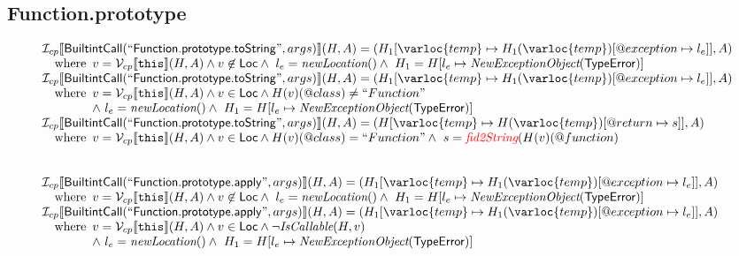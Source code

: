 \subsection{Function.prototype}
\[
\begin{array}{l}

\I _{cp}\lbr \SF{BuiltintCall}(``\SF{Function.prototype.toString}",args)\rbr(H,A)
 = (H_1[\varloc{temp}\mapsto H_1(\varloc{temp})[\varprop{exception}\mapsto l_e]], A) \\
\quad\wherec{
  v = \V _{cp}\lbr \TT{this}\rbr (H,A) \land v \not\in \SF{Loc}
  \land\ l_e = \hf{newLocation}() \land\ H_1=H[l_e\mapsto\hf{NewExceptionObject}(\SF{TypeError})] 
  }\\
  
\I _{cp}\lbr \SF{BuiltintCall}(``\SF{Function.prototype.toString}",args)\rbr(H,A)
 = (H_1[\varloc{temp}\mapsto H_1(\varloc{temp})[\varprop{exception}\mapsto l_e]], A) \\
\quad\wherec{
  v = \V _{cp}\lbr \TT{this}\rbr (H,A) \land v \in \SF{Loc} \land H(v)(@class) \neq ``Function"\\
  \land\ l_e = \hf{newLocation}() \land\ H_1=H[l_e\mapsto\hf{NewExceptionObject}(\SF{TypeError})] 
  }\\
  
\I _{cp}\lbr \SF{BuiltintCall}(``\SF{Function.prototype.toString}",args)\rbr(H,A)
 = (H[\varloc{temp}\mapsto H(\varloc{temp})[\varprop{return}\mapsto s]], A) \\
\quad\wherec{ 
  v = \V _{cp}\lbr \TT{this}\rbr (H,A) \land v \in \SF{Loc} \land H(v)(@class) = ``Function"
  \land\ s = \hf{\inred fid2String}(H(v)(\varprop{function})
  }\\
\\\\


\I _{cp}\lbr \SF{BuiltintCall}(``\SF{Function.prototype.apply}",args)\rbr(H,A)
 = (H_1[\varloc{temp}\mapsto H_1(\varloc{temp})[\varprop{exception}\mapsto l_e]], A) \\
\quad\wherec{
  v = \V _{cp}\lbr \TT{this}\rbr (H,A) \land v \not\in \SF{Loc}
  \land\ l_e = \hf{newLocation}() \land\ H_1=H[l_e\mapsto\hf{NewExceptionObject}(\SF{TypeError})] 
  }\\
  
\I _{cp}\lbr \SF{BuiltintCall}(``\SF{Function.prototype.apply}",args)\rbr(H,A)
 = (H_1[\varloc{temp}\mapsto H_1(\varloc{temp})[\varprop{exception}\mapsto l_e]], A) \\
\quad\wherec{
  v = \V _{cp}\lbr \TT{this}\rbr (H,A) \land v \in \SF{Loc} \land \neg \hf{IsCallable}(H,v)\\
  \land\ l_e = \hf{newLocation}() \land\ H_1=H[l_e\mapsto\hf{NewExceptionObject}(\SF{TypeError})] 
  }\\


\end{array}\]
